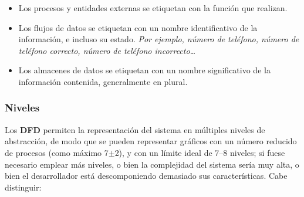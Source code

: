 \begin{itemize}
    \item Los procesos y entidades externas se etiquetan con la función que realizan.
    \item Los flujos de datos se etiquetan con un nombre identificativo de la información, e incluso su estado. \textit{Por ejemplo, número de teléfono, número de teléfono correcto, número de teléfono incorrecto\ldots}
    \item Los almacenes de datos se etiquetan con un nombre significativo de la información contenida, generalmente en plural.
\end{itemize}

\subsubsection{Niveles}

Los \textbf{DFD} permiten la representación del sistema en múltiples niveles de abstracción, de modo que se pueden representar gráficos con un número reducido de procesos (como máximo 7$\pm$2), y con un límite ideal de 7--8 niveles; si fuese necesario emplear más niveles, o bien la complejidad del sistema sería muy alta, o bien el desarrollador está descomponiendo demasiado sus características. Cabe distinguir:

